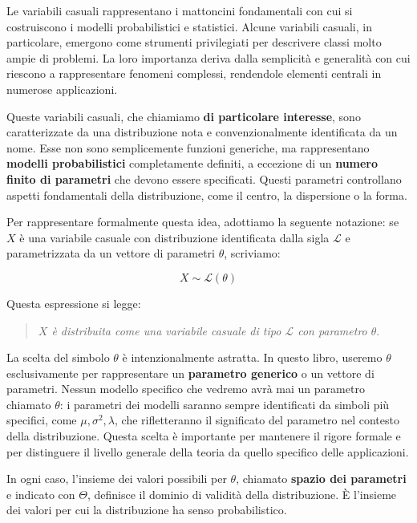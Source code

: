 \documentclass[
  11pt,
]{book}
\theoremstyle{mytheoremstyle}
\theoremstyle{mydefstyle}
\begin{document}
Le variabili casuali rappresentano i mattoncini fondamentali con cui si costruiscono i modelli probabilistici e statistici. Alcune variabili casuali, in particolare, emergono come strumenti privilegiati per descrivere classi molto ampie di problemi. La loro importanza deriva dalla semplicità e generalità con cui riescono a rappresentare fenomeni complessi, rendendole elementi centrali in numerose applicazioni.

Queste variabili casuali, che chiamiamo \textbf{di particolare interesse}, sono caratterizzate da una distribuzione nota e convenzionalmente identificata da un nome. Esse non sono semplicemente funzioni generiche, ma rappresentano \textbf{modelli probabilistici} completamente definiti, a eccezione di un \textbf{numero finito di parametri} che devono essere specificati. Questi parametri controllano aspetti fondamentali della distribuzione, come il centro, la dispersione o la forma.

Per rappresentare formalmente questa idea, adottiamo la seguente notazione: se \(X\) è una variabile casuale con distribuzione identificata dalla sigla \(\mathscr{L}\) e parametrizzata da un vettore di parametri \(\theta\), scriviamo:

\[
X \sim \mathscr{L}(\theta)
\]

Questa espressione si legge:

\begin{quote}
\emph{\(X\) è distribuita come una variabile casuale di tipo \(\mathscr{L}\) con parametro \(\theta\)}.
\end{quote}

La scelta del simbolo \(\theta\) è intenzionalmente astratta. In questo libro, useremo \(\theta\) esclusivamente per rappresentare un \textbf{parametro generico} o un vettore di parametri. Nessun modello specifico che vedremo avrà mai un parametro chiamato \(\theta\): i parametri dei modelli saranno sempre identificati da simboli più specifici, come \(\mu, \sigma^2, \lambda\), che rifletteranno il significato del parametro nel contesto della distribuzione. Questa scelta è importante per mantenere il rigore formale e per distinguere il livello generale della teoria da quello specifico delle applicazioni.

In ogni caso, l'insieme dei valori possibili per \(\theta\), chiamato \textbf{spazio dei parametri} e indicato con \(\Theta\), definisce il dominio di validità della distribuzione. È l'insieme dei valori per cui la distribuzione ha senso probabilistico.
\end{document}
